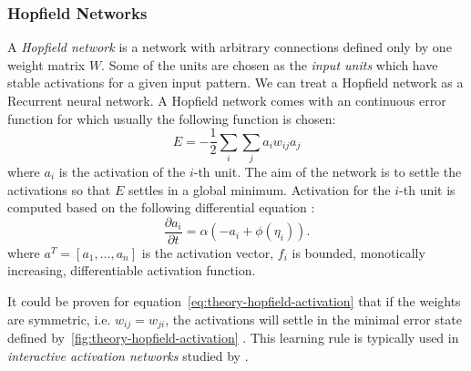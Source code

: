 \subsubsection{Hopfield Networks}
\label{sec:theory-hopfield}

A \emph{Hopfield network} \citep{hopfield1984neurons} is a network with arbitrary connections defined only by one weight matrix $W$. Some of the units are chosen as the \emph{input units} which have stable activations for a given input pattern. We can treat a Hopfield network as a Recurrent neural network. A Hopfield network comes with an continuous error function for which usually the following function is chosen: 
\begin{equation}
  \label{eq:theory-hopfield-error}
  E = -\frac{1}{2}\sum_i\sum_ja_iw_{ij}a_j
\end{equation} 
where $a_i$ is the activation of the $i$-th unit. The aim of the network is to settle the activations so that $E$ settles in a global minimum. Activation for the $i$-th unit is computed based on the following differential equation \citep{hopfield1984neurons}: 
\begin{equation}
  \label{eq:theory-hopfield-activation}
  \frac{\partial a_i}{\partial t} = \alpha(-a_i + \phi(\eta_i)).
\end{equation} 
where $a^T = [a_1,\ldots,a_n]$ is the activation vector, $f_i$ is bounded, monotically increasing, differentiable activation function.

It could be proven for equation~\ref{eq:theory-hopfield-activation} that if the weights are symmetric, i.e. $w_{ij} = w_{ji}$, the activations will settle in the minimal error state defined by~\ref{fig:theory-hopfield-activation} \citep{hopfield1984neurons}. This learning rule is typically used in \emph{interactive activation networks} studied by \citet{grossberg1978theory, mcclelland1981interactive}. 


